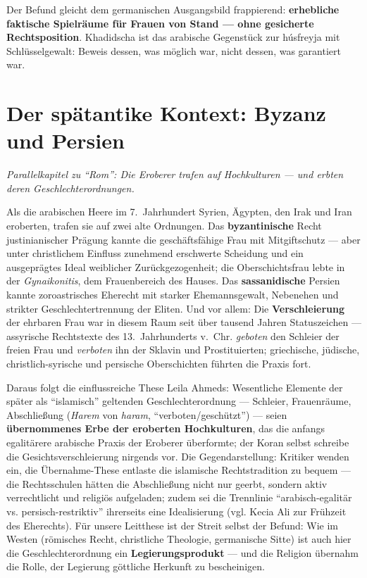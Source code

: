 \documentclass[11pt,a4paper,ngerman]{scrartcl}
\newcommand{\chipbase}[2]{\hspace{0pt}{\footnotesize\textcolor{#1}{[\textsc{#2}]}}}
\newcommand{\chipbelegt}[1]{\chipbase{chipgreen}{#1}}
\newcommand{\chipplausibel}[1]{\chipbase{chipamber}{#1}}
\newcommand{\chipumstritten}[1]{\chipbase{chipred}{#1}}
\begin{document}
Der Befund gleicht dem germanischen Ausgangsbild frappierend: \textbf{erhebliche faktische Spielräume für Frauen von Stand --- ohne gesicherte Rechtsposition}. Khadidscha ist das arabische Gegenstück zur húsfreyja mit Schlüsselgewalt: Beweis dessen, was möglich war, nicht dessen, was garantiert war.

\section{Der spätantike Kontext: Byzanz und Persien}
\noindent\textit{Parallelkapitel zu \enquote{Rom}: Die Eroberer trafen auf Hochkulturen --- und erbten deren Geschlechterordnungen.}
\medskip

Als die arabischen Heere im 7.~Jahrhundert Syrien, Ägypten, den Irak und Iran eroberten, trafen sie auf zwei alte Ordnungen. Das \textbf{byzantinische} Recht justinianischer Prägung kannte die geschäftsfähige Frau mit Mitgiftschutz --- aber unter christlichem Einfluss zunehmend erschwerte Scheidung und ein ausgeprägtes Ideal weiblicher Zurückgezogenheit; die Oberschichtsfrau lebte in der \emph{Gynaikonitis}, dem Frauenbereich des Hauses. Das \textbf{sassanidische} Persien kannte zoroastrisches Eherecht mit starker Ehemannsgewalt, Nebenehen und strikter Geschlechtertrennung der Eliten. Und vor allem: Die \textbf{Verschleierung} der ehrbaren Frau war in diesem Raum seit über tausend Jahren Statuszeichen --- assyrische Rechtstexte des 13.~Jahrhunderts v.~Chr. \emph{geboten} den Schleier der freien Frau und \emph{verboten} ihn der Sklavin und Prostituierten; griechische, jüdische, christlich-syrische und persische Oberschichten führten die Praxis fort. \chipbelegt{belegt}

Daraus folgt die einflussreiche These Leila Ahmeds: Wesentliche Elemente der später als \enquote{islamisch} geltenden Geschlechterordnung --- Schleier, Frauenräume, Abschließung (\emph{Harem} von \emph{haram}, \enquote{verboten/geschützt}) --- seien \textbf{übernommenes Erbe der eroberten Hochkulturen}, das die anfangs egalitärere arabische Praxis der Eroberer überformte; der Koran selbst schreibe die Gesichtsverschleierung nirgends vor. \chipplausibel{plausibel} Die Gegendarstellung: Kritiker wenden ein, die Übernahme-These entlaste die islamische Rechtstradition zu bequem --- die Rechtsschulen hätten die Abschließung nicht nur geerbt, sondern aktiv verrechtlicht und religiös aufgeladen; zudem sei die Trennlinie \enquote{arabisch-egalitär vs. persisch-restriktiv} ihrerseits eine Idealisierung (vgl. Kecia Ali zur Frühzeit des Eherechts). \chipumstritten{umstritten} Für unsere Leitthese ist der Streit selbst der Befund: Wie im Westen (römisches Recht, christliche Theologie, germanische Sitte) ist auch hier die Geschlechterordnung ein \textbf{Legierungsprodukt} --- und die Religion übernahm die Rolle, der Legierung göttliche Herkunft zu bescheinigen.
\end{document}
